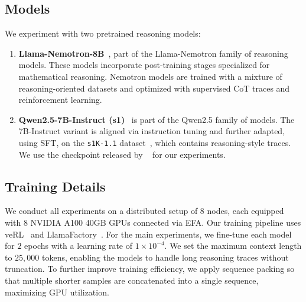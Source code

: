 \documentclass{article}
\newcommand{\zain}[1]{{\color{blue}[ZS: #1]}}
\begin{document}
\subsection{Models}
We experiment with two pretrained reasoning models:  
\begin{enumerate}[leftmargin=*]
    \item \textbf{Llama-Nemotron-8B}~\citep{bercovich2025llama}, part of the Llama-Nemotron family of reasoning models. These models incorporate post-training stages specialized for mathematical reasoning. Nemotron models are trained with a mixture of reasoning-oriented datasets and optimized with supervised CoT traces and reinforcement learning. 
    \item \textbf{Qwen2.5-7B-Instruct (s1)}~\citep{hui2024qwen2} is part of the Qwen2.5 family of models. The 7B-Instruct variant is aligned via instruction tuning and further adapted, using SFT, on the \texttt{s1K-1.1} dataset~\citep{muennighoff2025s1}, which contains reasoning-style traces. We use the checkpoint released by ~\cite{muennighoff2025s1} for our experiments.
\end{enumerate}

\subsection{Training Details}
\label{subsec:training_details}
We conduct all experiments on a distributed setup of 8 nodes, each equipped with 8 NVIDIA A100 40GB GPUs connected via EFA. Our training pipeline uses veRL~\cite{sheng2025hybridflow} and LlamaFactory~\cite{zheng2024llamafactory}. For the main experiments, we fine-tune each model for $2$ epochs with a learning rate of $1 \times 10^{-4}$. We set the maximum context length to $25{,}000$ tokens, enabling the models to handle long reasoning traces without truncation. To further improve training efficiency, we apply sequence packing so that multiple shorter samples are concatenated into a single sequence, maximizing GPU utilization.  
\end{document}
